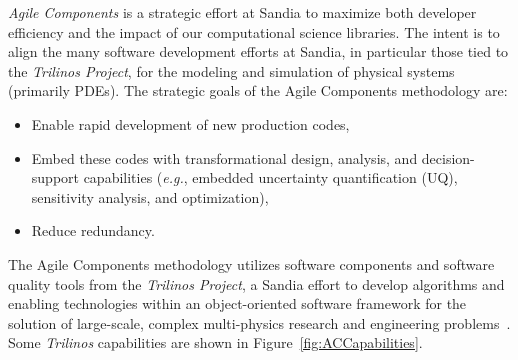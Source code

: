 \documentclass[pdf,ps2pdf,12pt,report]{SANDreport}
\theoremstyle{plain}
\theoremstyle{definition}
\theoremstyle{remark}
\numberwithin{equation}{section}
\begin{document}
\emph{Agile Components} is a strategic effort at Sandia to maximize both developer efficiency and the impact of our computational science libraries. The intent is to align the many software development efforts at Sandia, in particular those tied to the \emph{Trilinos Project}, for the modeling and simulation of physical systems (primarily PDEs). The strategic goals of the Agile Components methodology are:
\begin{itemize}
  \item Enable rapid development of new production codes,
  \item Embed these codes with transformational design, analysis, and decision-support capabilities ({\it e.g.}, embedded uncertainty quantification (UQ), sensitivity analysis, and optimization),
  \item Reduce redundancy.
\end{itemize}

The Agile Components methodology utilizes software components and software quality tools from the \emph{Trilinos Project}, a Sandia effort to develop algorithms and enabling technologies within an object-oriented software framework for the solution of large-scale, complex multi-physics research and engineering problems~\cite{Trilinos-Overview}. Some \emph{Trilinos} capabilities are shown in Figure~\ref{fig:ACCapabilities}.
\end{document}
